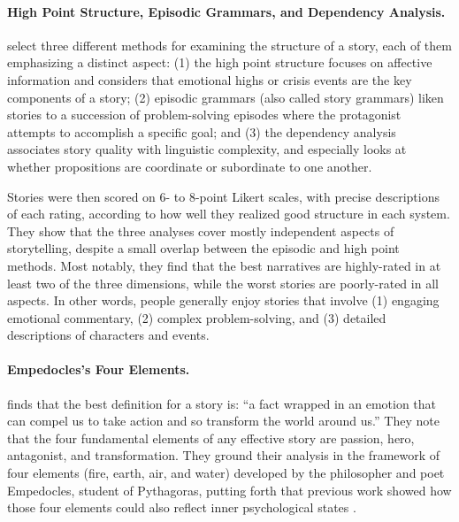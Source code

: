 \paragraph{High Point Structure, Episodic Grammars, and Dependency Analysis.}

\citet{mccabe1984makes} select three different methods for examining the structure of a story, each of them emphasizing a distinct aspect: (1) the high point structure \citep{labovNarrativeAnalysisOral1997} focuses on affective information and considers that emotional highs or crisis events are the key components of a story; (2) episodic grammars (also called story grammars) \citep{rumelhart1975notes} liken stories to a succession of problem-solving episodes where the protagonist attempts to accomplish a specific goal; and (3) the dependency analysis \citep{deese1978thought} associates story quality with linguistic complexity, and especially looks at whether propositions are coordinate or subordinate to one another.

Stories were then scored on 6- to 8-point Likert scales, with precise descriptions of each rating, according to how well they realized good structure in each system. They show that the three analyses cover mostly independent aspects of storytelling, despite a small overlap between the episodic and high point methods. Most notably, they find that the best narratives are highly-rated in at least two of the three dimensions, while the worst stories are poorly-rated in all aspects. In other words, people generally enjoy stories that involve (1) engaging emotional commentary, (2) complex problem-solving, and (3) detailed descriptions of characters and events.

\paragraph{Empedocles's Four Elements.}

\citet{dickman2003four} finds that the best definition for a story is: ``a fact wrapped in an emotion that can compel us to take action and so transform the world around us.'' They note that the four fundamental elements of any effective story are passion, hero, antagonist, and transformation. They ground their analysis in the framework of four elements (fire, earth, air, and water) developed by the philosopher and poet Empedocles, student of Pythagoras, putting forth that previous work showed how those four elements could also reflect inner psychological states \citep{hadot2002ancient}.

